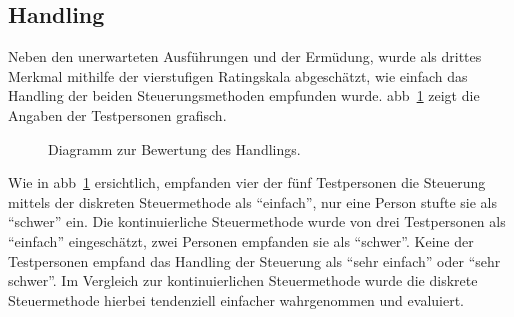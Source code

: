\subsection{Handling}
Neben den unerwarteten Ausführungen und der Ermüdung, wurde als drittes Merkmal mithilfe der vierstufigen Ratingskala abgeschätzt, wie einfach das Handling der beiden Steuerungsmethoden empfunden wurde. \acl{abb}~\ref{fig:handling} zeigt die Angaben der Testpersonen grafisch.
\begin{figure}[ht]
\begin{minipage}[t]{\linewidth} 
      \centering 
{}
\caption{Diagramm zur Bewertung des Handlings.}
\label{fig:handling}
   \end{minipage}%
\end{figure}

Wie in \acs{abb}~\ref{fig:handling} ersichtlich, empfanden vier der fünf Testpersonen die Steuerung mittels der diskreten Steuermethode als \enquote{einfach}, nur eine Person stufte sie als \enquote{schwer} ein. Die kontinuierliche Steuermethode wurde von drei Testpersonen als \enquote{einfach} eingeschätzt, zwei Personen empfanden sie als \enquote{schwer}. Keine der Testpersonen empfand das Handling der Steuerung als \enquote{sehr einfach} oder \enquote{sehr schwer}. Im Vergleich zur kontinuierlichen Steuermethode wurde die diskrete Steuermethode hierbei tendenziell einfacher wahrgenommen und evaluiert.

